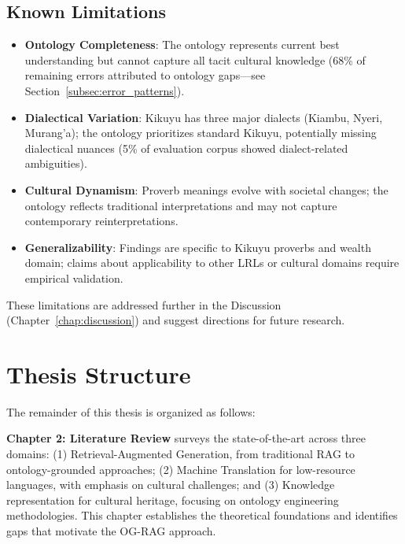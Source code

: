 \subsection{Known Limitations}
\label{subsec:limitations_known}

\begin{itemize}
    \item \textbf{Ontology Completeness}: The ontology represents current best understanding but cannot capture all tacit cultural knowledge (68\% of remaining errors attributed to ontology gaps—see Section~\ref{subsec:error_patterns}).
    
    \item \textbf{Dialectical Variation}: Kikuyu has three major dialects (Kiambu, Nyeri, Murang'a); the ontology prioritizes standard Kikuyu, potentially missing dialectical nuances (5\% of evaluation corpus showed dialect-related ambiguities).
    
    \item \textbf{Cultural Dynamism}: Proverb meanings evolve with societal changes; the ontology reflects traditional interpretations and may not capture contemporary reinterpretations.
    
    \item \textbf{Generalizability}: Findings are specific to Kikuyu proverbs and wealth domain; claims about applicability to other LRLs or cultural domains require empirical validation.
\end{itemize}

These limitations are addressed further in the Discussion (Chapter~\ref{chap:discussion}) and suggest directions for future research.

\section{Thesis Structure}
\label{sec:structure}

The remainder of this thesis is organized as follows:

\textbf{Chapter 2: Literature Review} surveys the state-of-the-art across three domains: (1) Retrieval-Augmented Generation, from traditional RAG to ontology-grounded approaches; (2) Machine Translation for low-resource languages, with emphasis on cultural challenges; and (3) Knowledge representation for cultural heritage, focusing on ontology engineering methodologies. This chapter establishes the theoretical foundations and identifies gaps that motivate the OG-RAG approach.

